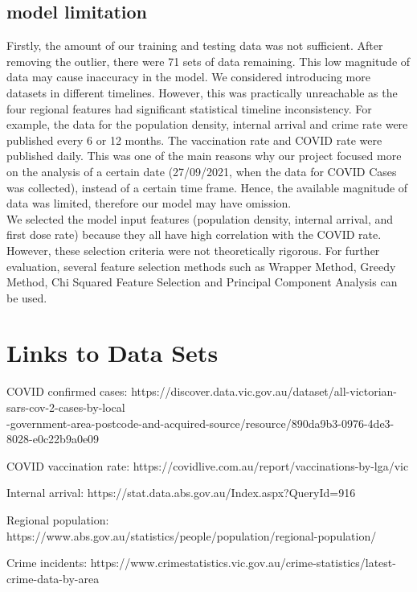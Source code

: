 \documentclass[a4, 11pt]{article}
\begin{document}
\subsection{model limitation}
Firstly, the amount of our training and testing data was not sufficient. After removing the outlier, there were 71 sets of data remaining. This low magnitude of data may cause inaccuracy in the model. We considered introducing more datasets in different timelines. However, this was practically unreachable as the four regional features had significant statistical timeline inconsistency. For example, the data for the population density, internal arrival and crime rate were published every 6 or 12 months. The vaccination rate and COVID rate were published daily. This was one of the main reasons why our project focused more on the analysis of a certain date (27/09/2021, when the data for COVID Cases was collected), instead of a certain time frame. Hence, the available magnitude of data was limited, therefore our model may have omission.\\
We selected the model input features (population density, internal arrival, and first dose rate) because they all have high correlation with the COVID rate. However, these selection criteria were not theoretically rigorous. For further evaluation, several feature selection methods such as Wrapper Method, Greedy Method, Chi Squared Feature Selection and Principal Component Analysis can be used.




\section{Links to Data Sets}
COVID confirmed cases: https://discover.data.vic.gov.au/dataset/all-victorian-sars-cov-2-cases-by-local\\-government-area-postcode-and-acquired-source/resource/890da9b3-0976-4de3-8028-e0c22b9a0e09 

COVID vaccination rate: https://covidlive.com.au/report/vaccinations-by-lga/vic

Internal arrival: 
https://stat.data.abs.gov.au/Index.aspx?QueryId=916

Regional population: 
https://www.abs.gov.au/statistics/people/population/regional-population/
 
Crime incidents: 
https://www.crimestatistics.vic.gov.au/crime-statistics/latest-crime-data-by-area
\end{document}
